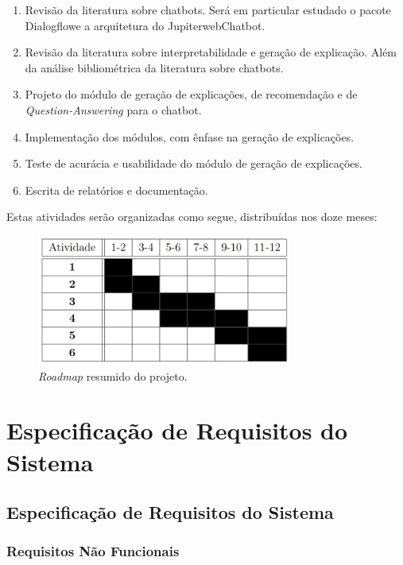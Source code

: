 \documentclass[]{politex}
\begin{document}
\begin{enumerate}
    \item Revisão da literatura sobre chatbots. Será em particular estudado o pacote Dialogflowe a arquitetura do JupiterwebChatbot.
    \item Revisão da literatura sobre interpretabilidade e geração de explicação. Além da análise bibliométrica da literatura sobre chatbots.
    \item Projeto do módulo de geração de explicações, de recomendação e de \textit{Question-Answering} para o chatbot. 
    \item Implementação dos módulos, com ênfase na geração de explicações.
    \item Teste de acurácia e usabilidade do módulo de geração de explicações.
    \item Escrita de relatórios e documentação.
\end{enumerate}

Estas atividades serão organizadas como segue, distribuídas nos doze meses:

\begin{figure}[h]
    \centering
    \includegraphics[width=0.75\textwidth]{images/roadmap.png}
    \caption{\textit{Roadmap} resumido do projeto.}
    \label{fig:project_roadmap}
\end{figure}

\part{Especificação de Requisitos do Sistema}

\chapter{Especificação de Requisitos do Sistema}

\section{Requisitos Não Funcionais}
\end{document}

